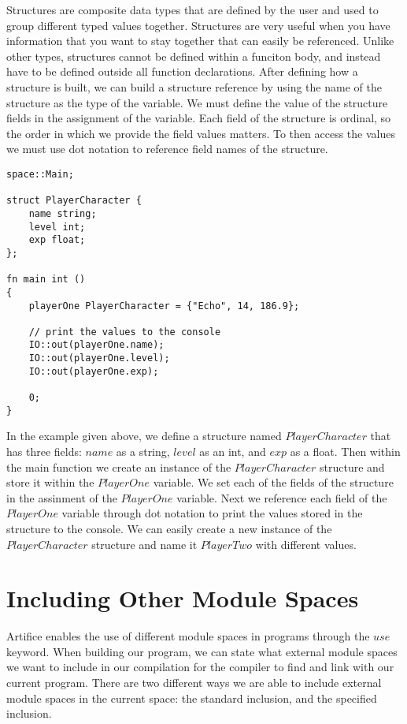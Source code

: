 \documentclass{article}
\begin{document}
Structures are composite data types that are defined by the user and used to group different typed values together. Structures are very useful when you have information
that you want to stay together that can easily be referenced. Unlike other types, structures cannot be defined within a funciton body, and instead have to be defined outside all
function declarations. After defining how a structure is built, we can build a structure reference by using the name of the structure as the type of the variable. We must
define the value of the structure fields in the assignment of the variable. Each field of the structure is ordinal, so the order in which we provide
the field values matters. To then access the values we must use dot notation to reference field names of the structure.

\begin{lstlisting}
space::Main;

struct PlayerCharacter {
	name string;
	level int;
	exp float;
};

fn main int ()
{
	playerOne PlayerCharacter = {"Echo", 14, 186.9};

	// print the values to the console
	IO::out(playerOne.name);
	IO::out(playerOne.level);
	IO::out(playerOne.exp);

	0;
}
\end{lstlisting}

In the example given above, we define a structure named $PlayerCharacter$ that has three fields: $name$ as a string, $level$ as an int, and $exp$
as a float. Then within the main function we create an instance of the $PlayerCharacter$ structure and store it within the $PlayerOne$ variable.
We set each of the fields of the structure in the assinment of the $PlayerOne$ variable. Next we reference each field of the $PlayerOne$ variable
through dot notation to print the values stored in the structure to the console. We can easily create a new instance of the $PlayerCharacter$ structure
and name it $PlayerTwo$ with different values.


\section{Including Other Module Spaces}

Artifice enables the use of different module spaces in programs through the $use$ keyword. When building our program, we can state what external module spaces we want to include in
our compilation for the compiler to find and link with our current program. There are two different ways we are able to include external module spaces in the current space: the
standard inclusion, and the specified inclusion.
\end{document}
